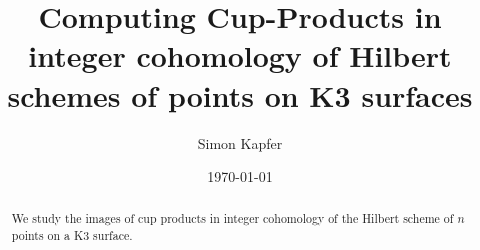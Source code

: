 \documentclass{amsart}
\DeclareMathOperator{\Hilb}{Hilb}
\newcommand{\IZ}{\mathbb{Z}}
\theoremstyle{plain}
\theoremstyle{definition}
\theoremstyle{remark}
\begin{document}
\title[Products in $H^\ast(\Hilb^n(K3), \IZ)$]{Computing Cup-Products in integer cohomology of Hilbert schemes of points on K3 surfaces}


\author{Simon Kapfer}
\address{Simon Kapfer, Lehrstuhl f\"ur Algebra und Zahlentheorie, Universit\"ats\-stra{\ss}e~14, D-86159 Augsburg}


\date{\today}



\begin{abstract} 
We study the images of cup 
products in integer cohomology of the Hilbert scheme of $n$ points on a K3 surface. 
\end{abstract}

\maketitle


\end{document}
